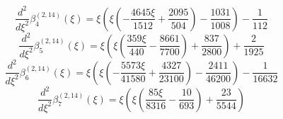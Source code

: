 \begin{equation}
\frac{d^{2}}{d\xi^{2}}\beta_{4}^{(2,14)} (\xi) =
 \xi \left(\xi \left(- \frac{4645 \xi}{1512} + \frac{2095}{504}\right) - \frac{1031}{1008}\right) - \frac{1}{112}
\end{equation}
\begin{equation}
\frac{d^{2}}{d\xi^{2}}\beta_{5}^{(2,14)} (\xi) =
 \xi \left(\xi \left(\frac{359 \xi}{440} - \frac{8661}{7700}\right) + \frac{837}{2800}\right) + \frac{2}{1925}
\end{equation}
\begin{equation}
\frac{d^{2}}{d\xi^{2}}\beta_{6}^{(2,14)} (\xi) =
 \xi \left(\xi \left(- \frac{5573 \xi}{41580}
 + \frac{4327}{23100}\right) - \frac{2411}{46200}\right) - \frac{1}{16632}
\end{equation}
\begin{equation}
\frac{d^{2}}{d\xi^{2}}\beta_{7}^{(2,14)} (\xi) =
 \xi \left(\xi \left(\frac{85 \xi}{8316} - \frac{10}{693}\right) + \frac{23}{5544}\right)
\end{equation}
